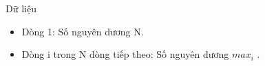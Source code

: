 Dữ liệu  
\begin{itemize}
	\item     Dòng 1: Số nguyên dương N.   
	\item     Dòng i trong N dòng tiếp theo: Số nguyên dương $max_{i}$    .   
\end{itemize}